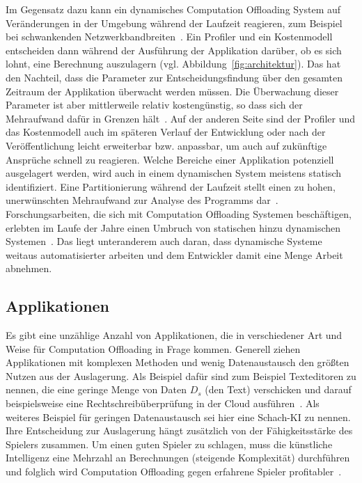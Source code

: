 \documentclass{sigchi}
\begin{document}
Im Gegensatz dazu kann ein dynamisches Computation Offloading System auf Veränderungen in der Umgebung während der Laufzeit reagieren, zum Beispiel bei schwankenden Netzwerkbandbreiten~\cite{o4}.
Ein Profiler und ein Kostenmodell entscheiden dann während der Ausführung der Applikation darüber, ob es sich lohnt, eine Berechnung auszulagern (vgl. Abbildung~\ref{fig:architektur}).
Das hat den Nachteil, dass die Parameter zur Entscheidungsfindung über den gesamten Zeitraum der Applikation überwacht werden müssen.
Die Überwachung dieser Parameter ist aber mittlerweile relativ kostengünstig, so dass sich der Mehraufwand dafür in Grenzen hält~\cite{thinkair}.
Auf der anderen Seite sind der Profiler und das Kostenmodell auch im späteren Verlauf der Entwicklung oder nach der Veröffentlichung leicht erweiterbar bzw. anpassbar, um auch auf zukünftige Ansprüche schnell zu reagieren.
Welche Bereiche einer Applikation potenziell ausgelagert werden, wird auch in einem dynamischen System meistens statisch identifiziert.
Eine Partitionierung während der Laufzeit stellt einen zu hohen, unerwünschten Mehraufwand zur Analyse des Programms dar~\cite{o4}.
Forschungsarbeiten, die sich mit Computation Offloading Systemen beschäftigen, erlebten im Laufe der Jahre einen Umbruch von statischen hinzu dynamischen Systemen~\cite{o4}.
Das liegt unteranderem auch daran, dass dynamische Systeme weitaus automatisierter arbeiten und dem Entwickler damit eine Menge Arbeit abnehmen.

\subsection{Applikationen}

Es gibt eine unzählige Anzahl von Applikationen, die in verschiedener Art und Weise für Computation Offloading in Frage kommen.
Generell ziehen Applikationen mit komplexen Methoden und wenig Datenaustausch den größten Nutzen aus der Auslagerung.
Als Beispiel dafür sind zum Beispiel Texteditoren zu nennen, die eine geringe Menge von Daten $D_s$ (den Text) verschicken und darauf beispielsweise eine Rechtschreibüberprüfung in der Cloud ausführen~\cite{o4}.
Als weiteres Beispiel für geringen Datenaustausch sei hier eine Schach-KI zu nennen.
Ihre Entscheidung zur Auslagerung hängt zusätzlich von der Fähigkeitsstärke des Spielers zusammen.
Um einen guten Spieler zu schlagen, muss die künstliche Intelligenz eine Mehrzahl an Berechnungen (steigende Komplexität) durchführen und folglich wird Computation Offloading  gegen erfahrene Spieler profitabler~\cite{o4}. 
\end{document}
